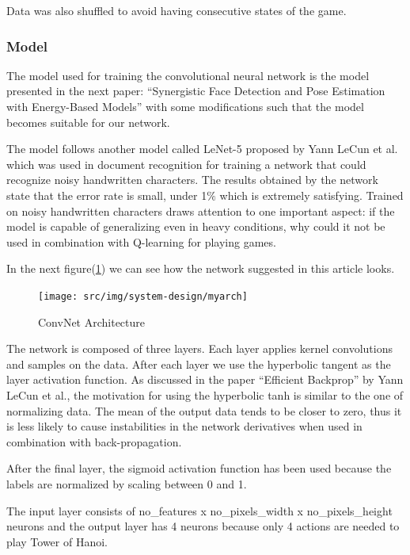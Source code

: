 Data was also shuffled to avoid having consecutive states of the game.

\subsubsection{Model}

The model used for training the convolutional neural network is the model presented in the next paper: ``Synergistic Face Detection and Pose Estimation with Energy-Based Models''\cite{energy-based} with some modifications such that the model becomes suitable for our network.

The model follows another model called LeNet-5 proposed by Yann LeCun et al. which was used in document recognition\cite{basedlearning} for training a network that could recognize noisy handwritten characters. The results obtained by the network state that the error rate is small, under 1$\%$ which is extremely satisfying. Trained on noisy handwritten characters draws attention to one important aspect: if the model is capable of generalizing even in heavy conditions, why could it not be used in combination with Q-learning for playing games.

In the next figure(\ref{fig:myarch}) we can see how the network suggested in this article looks. 

\begin{figure}[h]
	\begin{center}
		\texttt{[image: src/img/system-design/myarch]}
		\caption{ConvNet Architecture} \label{fig:myarch}
    \end{center}
\end{figure}

The network is composed of three layers. Each layer applies kernel convolutions and samples on the data. After each layer we use the hyperbolic tangent as the layer activation function. As discussed in the paper ``Efficient Backprop'' by Yann LeCun et al., the motivation for using the hyperbolic tanh is similar to the one of normalizing data. The mean of the output data tends to be closer to zero, thus it is less likely to cause instabilities in the network derivatives when used in combination with back-propagation.

After the final layer, the sigmoid activation function has been used because the labels are normalized by scaling between 0 and 1.

The input layer consists of no_features x no_pixels_width x no_pixels_height neurons and the output layer has 4 neurons because only 4 actions are needed to play Tower of Hanoi.

